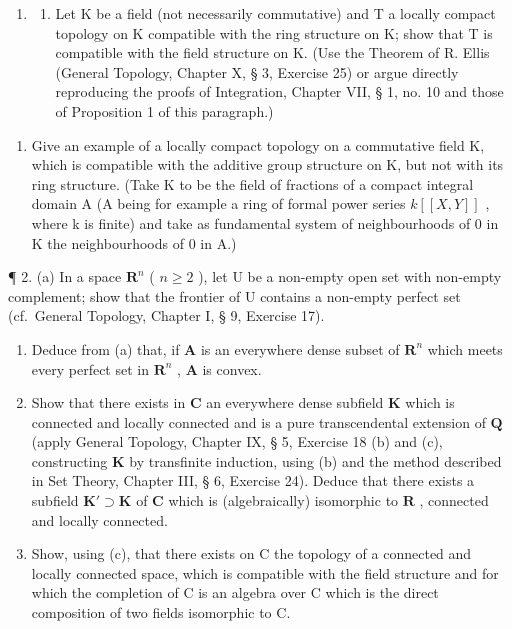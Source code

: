 
\begin{enumerate}
\def\labelenumi{\arabic{enumi}.}
\tightlist
\item
  \begin{enumerate}
  \def\labelenumii{(\alph{enumii})}
  \tightlist
  \item
    Let K be a field (not necessarily commutative) and T a locally compact topology on K compatible with the ring structure on K; show that T is compatible with the field structure on K. (Use the Theorem of R. Ellis (General Topology, Chapter X, § 3, Exercise 25) or argue directly reproducing the proofs of Integration, Chapter VII, § 1, no. 10 and those of Proposition 1 of this paragraph.)
  \end{enumerate}
\end{enumerate}

\begin{enumerate}
\def\labelenumi{(\alph{enumi})}
\setcounter{enumi}{1}
\tightlist
\item
  Give an example of a locally compact topology on a commutative field K, which is compatible with the additive group structure on K, but not with its ring structure. (Take K to be the field of fractions of a compact integral domain A (A being for example a ring of formal power series \(k[[X, Y]]\) , where k is finite) and take as fundamental system of neighbourhoods of 0 in K the neighbourhoods of 0 in A.)
\end{enumerate}

¶ 2. (a) In a space \(\mathbf{R}^n\) ( \(n \geqslant 2\) ), let U be a non-empty open set with non-empty complement; show that the frontier of U contains a non-empty perfect set (cf.~General Topology, Chapter I, § 9, Exercise 17).

\begin{enumerate}
\def\labelenumi{(\alph{enumi})}
\setcounter{enumi}{1}
\item
  Deduce from (a) that, if \(\mathbf{A}\) is an everywhere dense subset of \(\mathbf{R}^n\) which meets every perfect set in \(\mathbf{R}^n\) , \(\mathbf{A}\) is convex.
\item
  Show that there exists in \(\mathbf{C}\) an everywhere dense subfield \(\mathbf{K}\) which is connected and locally connected and is a pure transcendental extension of \(\mathbf{Q}\) (apply General Topology, Chapter IX, § 5, Exercise 18 (b) and (c), constructing \(\mathbf{K}\) by transfinite induction, using (b) and the method described in Set Theory, Chapter III, § 6, Exercise 24). Deduce that there exists a subfield \(\mathbf{K}' \supset \mathbf{K}\) of \(\mathbf{C}\) which is (algebraically) isomorphic to \(\mathbf{R}\) , connected and locally connected.
\item
  Show, using (c), that there exists on C the topology of a connected and locally connected space, which is compatible with the field structure and for which the completion of C is an algebra over C which is the direct composition of two fields isomorphic to C.
\end{enumerate}

